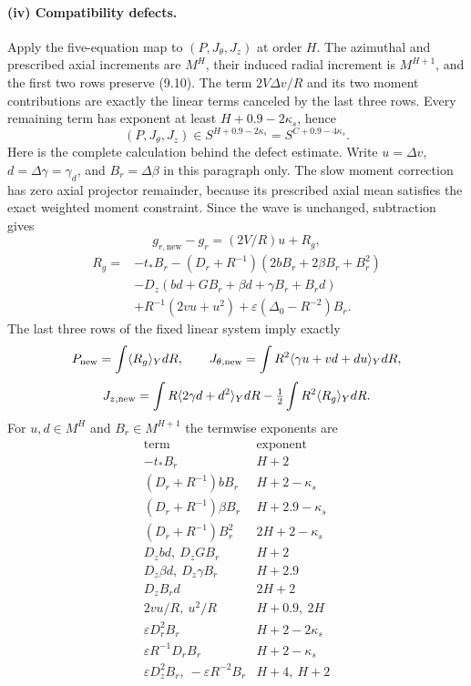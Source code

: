 \documentclass[10pt,a4paper]{article}
\begin{document}
\paragraph{(iv) Compatibility defects.}
Apply the five-equation map to $(P,J_\theta,J_z)$ at order $H$.  The azimuthal
and prescribed axial increments are $M^H$, their induced radial increment is
$M^{H+1}$, and the first two rows preserve (9.10).  The term
$2V\Delta v/R$ and its two moment contributions are exactly the linear terms
canceled by the last three rows.  Every remaining term has exponent at least
$H+0.9-2\kappa_s$, hence
\[
 (P,J_\theta,J_z)\in S^{H+0.9-2\kappa_s}=S^{C+0.9-4\kappa_s}.
\]
Here is the complete calculation behind the defect estimate. Write
$u=\Delta v$, $d=\Delta\gamma=\gamma_d$, and $B_r=\Delta\beta$ in this
paragraph only. The slow moment correction has zero axial projector
remainder, because its prescribed axial mean satisfies the exact weighted
moment constraint. Since the wave is unchanged, subtraction gives
\[
g_{r,\mathrm{new}}-g_r=(2V/R)u+R_g,
\]
\begin{align*}
R_g={}&-t_*B_r-(D_r+R^{-1})(2bB_r+2\beta B_r+B_r^2)\\
&-D_z(bd+GB_r+\beta d+\gamma B_r+B_rd)\\
&+R^{-1}(2vu+u^2)+\varepsilon(\Delta_0-R^{-2})B_r .
\end{align*}
The last three rows of the fixed linear system imply exactly
\[
P_{\rm new}=\int\langle R_g\rangle_YdR,\qquad
J_{\theta,\rm new}=\int R^2\langle\gamma u+vd+du\rangle_YdR,
\]
\[
J_{z,\rm new}=\int R\langle2\gamma d+d^2\rangle_YdR
-\tfrac12\int R^2\langle R_g\rangle_YdR .
\]
For $u,d\in M^H$ and $B_r\in M^{H+1}$ the termwise exponents are
\[
\begin{array}{c|c}
\text{term}&\text{exponent}\\ \hline
-t_*B_r&H+2\\
(D_r+R^{-1})bB_r&H+2-\kappa_s\\
(D_r+R^{-1})\beta B_r&H+2.9-\kappa_s\\
(D_r+R^{-1})B_r^2&2H+2-\kappa_s\\
D_zbd,\ D_zGB_r&H+2\\
D_z\beta d,\ D_z\gamma B_r&H+2.9\\
D_zB_rd&2H+2\\
2vu/R,\ u^2/R&H+0.9,\ 2H\\
\varepsilon D_r^2B_r&H+2-2\kappa_s\\
\varepsilon R^{-1}D_rB_r&H+2-\kappa_s\\
\varepsilon D_z^2B_r,\ -\varepsilon R^{-2}B_r&H+4,\ H+2
\end{array}
\]
\end{document}
